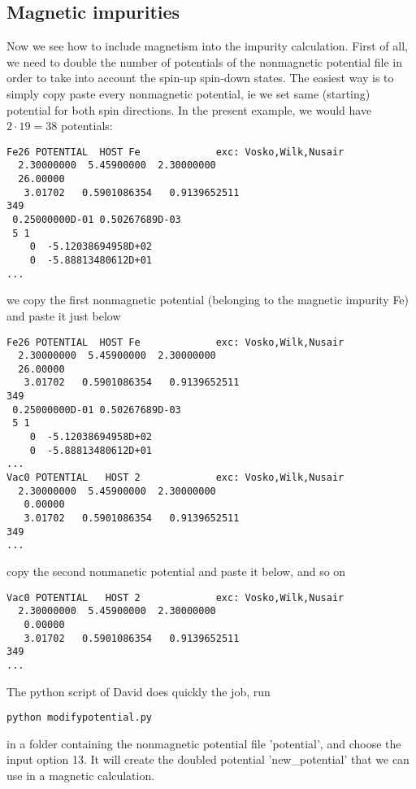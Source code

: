 \documentclass[11pt,fleqn]{book} %
\begin{document}
\subsection{Magnetic impurities}

Now we see how to include magnetism into the impurity calculation.
First of all, we need to double the number of potentials of the nonmagnetic potential file in order
to take into account the spin-up spin-down states.
The easiest way is to simply copy paste every nonmagnetic potential,
ie we set same (starting) potential for both spin directions. In the present example, we
would have $2\cdot19=38$ potentials:
\begin{VBox}
\begin{verbatim}
Fe26 POTENTIAL  HOST Fe             exc: Vosko,Wilk,Nusair
  2.30000000  5.45900000  2.30000000
  26.00000
   3.01702   0.5901086354   0.9139652511
349
 0.25000000D-01 0.50267689D-03
 5 1
    0  -5.12038694958D+02
    0  -5.88813480612D+01
...
\end{verbatim}
\end{VBox}

\noindent we copy the first nonmagnetic potential (belonging to the magnetic impurity Fe) and paste it just below
\begin{VBox}
\begin{verbatim}
Fe26 POTENTIAL  HOST Fe             exc: Vosko,Wilk,Nusair
  2.30000000  5.45900000  2.30000000
  26.00000
   3.01702   0.5901086354   0.9139652511
349
 0.25000000D-01 0.50267689D-03
 5 1
    0  -5.12038694958D+02
    0  -5.88813480612D+01
...
Vac0 POTENTIAL   HOST 2             exc: Vosko,Wilk,Nusair
  2.30000000  5.45900000  2.30000000
   0.00000
   3.01702   0.5901086354   0.9139652511
349
...
\end{verbatim}
\end{VBox}
\noindent copy the second nonmanetic potential and paste it below, and so on
\begin{VBox}
\begin{verbatim}
Vac0 POTENTIAL   HOST 2             exc: Vosko,Wilk,Nusair
  2.30000000  5.45900000  2.30000000
   0.00000
   3.01702   0.5901086354   0.9139652511
349
...
\end{verbatim}
\end{VBox}
The python script of David does quickly the job, run
\begin{VBox}
\begin{verbatim}
python modifypotential.py
\end{verbatim}
\end{VBox}
in a folder containing the nonmagnetic potential file 'potential', and choose the
input option 13. It will create the doubled potential 'new\_potential' that we can use
in a magnetic calculation.
\end{document}
